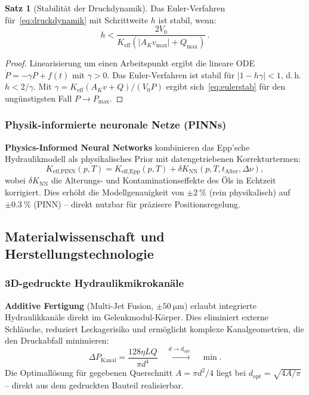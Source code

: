 ﻿\documentclass[a4paper,12pt]{scrreprt}
\theoremstyle{definition}
\newtheorem{satz}{Satz}[section]
\begin{document}
\begin{satz}[Stabilität der Druckdynamik]
\label{satz:druckstabil}
Das Euler-Verfahren für~\eqref{eq:druckdynamik} mit Schrittweite
$h$ ist stabil, wenn:
\begin{equation}
  h < \frac{2 V_0}{K_{\text{eff}} (|A_K v_{\max}| + Q_{\max})}\,.
  \label{eq:eulerstab}
\end{equation}
\end{satz}

\begin{proof}
Linearisierung um einen Arbeitspunkt ergibt die lineare ODE
$\dot{P} = -\gamma P + f(t)$ mit $\gamma > 0$.
Das Euler-Verfahren ist stabil für $|1 - h\gamma| < 1$,
d.\,h. $h < 2/\gamma$.
Mit $\gamma = K_{\text{eff}} (A_K v + Q)/(V_0 P)$ ergibt
sich~\eqref{eq:eulerstab} für den ungünstigsten Fall $P \to P_{\max}$.
\end{proof}

\subsubsection{Physik-informierte neuronale Netze (PINNs)}

\textbf{Physics-Informed Neural Networks} kombinieren das
Epp'sche Hydraulikmodell als physikalisches Prior mit
datengetriebenen Korrekturtermen:
\begin{equation}
  K_{\text{eff,PINN}}(p,T) = K_{\text{eff,Epp}}(p,T)
    + \delta K_{\text{NN}}(p,T,t_{\text{Alter}},\Delta\nu),
\end{equation}
wobei $\delta K_{\text{NN}}$ die Alterungs- und Kontaminationseffekte
des Öls in Echtzeit korrigiert. Dies erhöht die Modellgenauigkeit
von $\pm\SI{2}{\percent}$ (rein physikalisch) auf $\pm\SI{0.3}{\percent}$
(PINN) -- direkt nutzbar für präzisere Positionsregelung.

\subsection{Materialwissenschaft und Herstellungstechnologie}

\subsubsection{3D-gedruckte Hydraulikmikrokanäle}

\textbf{Additive Fertigung} (Multi-Jet Fusion, $\pm\SI{50}{\micro\meter}$)
erlaubt integrierte Hydraulikkanäle direkt im Gelenkmodul-Körper.
Dies eliminiert externe Schläuche, reduziert Leckagerisiko und
ermöglicht komplexe Kanalgeometrien, die den Druckabfall minimieren:
\begin{equation}
  \Delta P_{\text{Kanal}} = \frac{128 \eta L Q}{\pi d^4}
  \quad \xrightarrow{d \to d_{\text{opt}}} \quad \min.
\end{equation}
Die Optimallösung für gegebenen Querschnitt $A = \pi d^2/4$
liegt bei $d_{\text{opt}} = \sqrt{4A/\pi}$ -- direkt aus dem
gedruckten Bauteil realisierbar.
\end{document}

